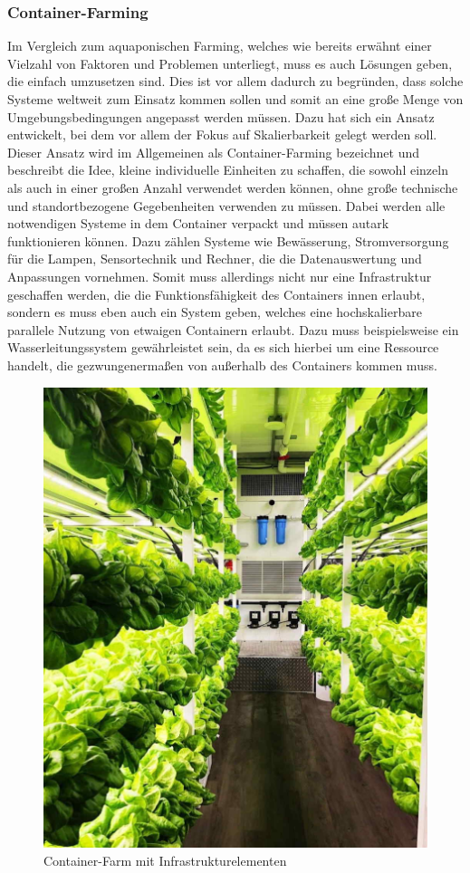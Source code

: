 \subsubsection{Container-Farming}
Im Vergleich zum aquaponischen Farming, welches wie bereits erwähnt einer Vielzahl von Faktoren und Problemen unterliegt, muss es auch Lösungen geben, die einfach umzusetzen sind. Dies ist vor allem dadurch zu begründen, dass solche Systeme weltweit zum Einsatz kommen sollen und somit an eine große Menge von Umgebungsbedingungen angepasst werden müssen. Dazu hat sich ein Ansatz entwickelt, bei dem vor allem der Fokus auf Skalierbarkeit gelegt werden soll. Dieser Ansatz wird im Allgemeinen als Container-Farming bezeichnet und beschreibt die Idee, kleine individuelle Einheiten zu schaffen, die sowohl einzeln als auch in einer großen Anzahl verwendet werden können, ohne große technische und standortbezogene Gegebenheiten verwenden zu müssen. Dabei werden alle notwendigen Systeme in dem Container verpackt und müssen autark funktionieren können. Dazu zählen Systeme wie Bewässerung, Stromversorgung für die Lampen, Sensortechnik und Rechner, die die Datenauswertung und Anpassungen vornehmen. Somit muss allerdings nicht nur eine Infrastruktur geschaffen werden, die die Funktionsfähigkeit des Containers innen erlaubt, sondern es muss eben auch ein System geben, welches eine hochskalierbare parallele Nutzung von etwaigen Containern erlaubt. Dazu muss beispielsweise ein Wasserleitungssystem gewährleistet sein, da es sich hierbei um eine Ressource handelt, die gezwungenermaßen von außerhalb des Containers kommen muss.
\begin{figure}
    \centering
    \includegraphics[width=0.7\linewidth]{thrive-container-farm-interior.jpg}
    \caption{Container-Farm mit Infrastrukturelementen}
    \label{fig:enter-label}
\end{figure}
